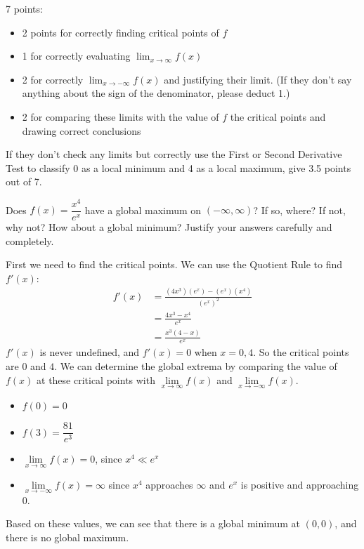 \documentclass{article}
\begin{document}
\begin{enumerate}
  \begin{grading}
    7 points:
    \begin{itemize}[nosep]
    \item 2 points for correctly finding critical points of $f$
    \item 1 for correctly evaluating $\displaystyle \lim_{x \to \infty} f(x)$
    \item 2 for correctly $\displaystyle \lim_{x \to -\infty} f(x)$ and justifying their limit. (If they don't say anything about the sign of the denominator, please deduct 1.)
    \item 2 for comparing these limits with the value of $f$ the critical points and drawing correct conclusions
    \end{itemize}
    If they don't check any limits but correctly use the First or Second Derivative Test to classify 0 as a local minimum and 4 as a local maximum, give 3.5 points out of 7. 
  \end{grading}

  \begin{problem}[\newpage]
    Does $f(x) = \dfrac{x^4}{e^x}$ have a global maximum on $(-\infty, \infty)$? If so, where? If not, why not? How about a global minimum? Justify your answers carefully and completely. 
  \end{problem}

  \begin{solution}
    First we need to find the critical points.
    We can use the Quotient Rule
    to find $f'(x)$:
    \begin{align*} 
    f'(x) &= \frac{(4x^3)(e^x) - (e^x)(x^4)}{(e^x)^2} \\
    &= \frac{4x^3 - x^4}{e^x} \\
    &= \frac{x^3(4-x)}{e^x}
    \end{align*}
    $f'(x)$ is
    never undefined, and $f'(x)=0$ when $x = 0, 4$.  
    So the critical
    points are $0$ and $4$. 
    We can determine the global extrema by
    comparing the value of $f(x)$
    at these critical points with $\lim\limits_{x\to \infty} f(x)$
    and $\lim\limits_{x \to -\infty} f(x)$.
    \begin{itemize}
        \item $f(0)=0$
        \item $f(3)=\dfrac{81}{e^3}$
        \item $\lim\limits_{x\to \infty} f(x) = 0$, since $x^4 \ll e^x$
        \item $\lim\limits_{x \to -\infty} f(x) = \infty$ since $x^4$
        approaches $\infty$ and $e^{x}$ is positive and approaching $0$.
    \end{itemize}
    Based on these values, we can see that there is a global minimum
    at $(0, 0)$, and there is no global maximum.
  \end{solution}


\end{enumerate}
\end{document}
